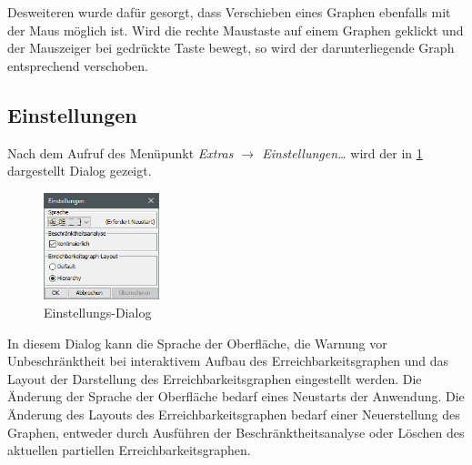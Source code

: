 Desweiteren wurde dafür gesorgt, dass Verschieben eines Graphen ebenfalls mit
der Maus möglich ist. Wird die rechte Maustaste auf einem Graphen geklickt und
der Mauszeiger bei gedrückte Taste bewegt, so wird der darunterliegende Graph
entsprechend verschoben.

\subsection{Einstellungen}
\label{sec:settings}
Nach dem Aufruf des Menüpunkt \emph{Extras $\rightarrow$ Einstellungen\ldots}
wird der in \cref{img:settings} dargestellt Dialog gezeigt.

\begin{figure}[H]
  \centering
  \includegraphics[width=0.3\textwidth]{../img/settings.png}
  \caption{Einstellungs-Dialog}
  \label{img:settings}
\end{figure}

In diesem Dialog kann die Sprache der Oberfläche, die Warnung vor
Unbeschränktheit bei interaktivem Aufbau des Erreichbarkeitsgraphen und das
Layout der Darstellung des Erreichbarkeitsgraphen eingestellt werden. Die
Änderung der Sprache der Oberfläche bedarf eines Neustarts der Anwendung. Die
Änderung des Layouts des Erreichbarkeitsgraphen bedarf einer Neuerstellung des
Graphen, entweder durch Ausführen der Beschränktheitsanalyse oder Löschen des
aktuellen partiellen Erreichbarkeitsgraphen.